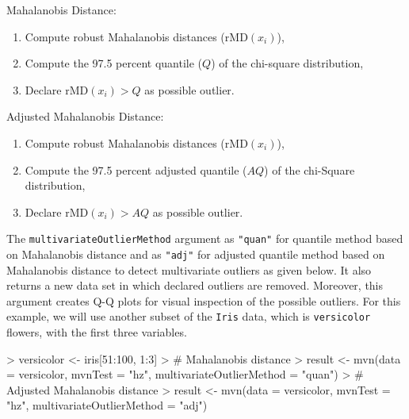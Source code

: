 \documentclass[11pt]{article}
\begin{document}
\noindent Mahalanobis Distance:
\begin{enumerate}
	\item {Compute robust Mahalanobis distances ($\mathrm{rMD}(x_i)$),}
	\item {Compute the 97.5 percent quantile ($Q$) of the chi-square distribution,}
	\item {Declare $\mathrm{rMD}(x_i) > Q$ as possible outlier.}
\end{enumerate}

\noindent Adjusted Mahalanobis Distance:
\begin{enumerate}
	\item {Compute robust Mahalanobis distances ($\mathrm{rMD}(x_i)$),}
	\item {Compute the 97.5 percent adjusted quantile ($AQ$) of the chi-Square distribution,}
	\item {Declare $\mathrm{rMD}(x_i) > AQ$ as possible outlier.}
\end{enumerate}

The \texttt{multivariateOutlierMethod} argument as \texttt{"quan"} for quantile method based on Mahalanobis distance and as \texttt{"adj"} for adjusted quantile method based on Mahalanobis distance to detect multivariate outliers as given below. It also returns a new data set in which declared outliers are removed. Moreover, this argument creates Q-Q plots for visual inspection of the possible outliers. For this example, we will use another subset of the \texttt{Iris} data, which is \texttt{versicolor} flowers, with the first three variables.

\begin{Schunk}
\begin{Sinput}
> versicolor <- iris[51:100, 1:3]
> # Mahalanobis distance
> result <- mvn(data = versicolor, mvnTest = "hz", multivariateOutlierMethod = "quan")
> # Adjusted Mahalanobis distance
> result <- mvn(data = versicolor, mvnTest = "hz", multivariateOutlierMethod = "adj")
\end{Sinput}
\end{Schunk}
\end{document}
